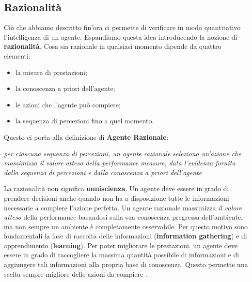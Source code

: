 \subsection{Razionalità}
Ciò che abbiamo descritto fin'ora ci permette di verificare in modo quantitativo l'intelligenza di un agente.
Espandiamo questa idea introducendo la nozione di \textbf{razionalità}.
Cosa sia razionale in qualsiasi momento dipende da quattro elementi:
\begin{itemize}
  \item la misura di prestazioni;
  \item la conoscenza a priori dell'agente;
  \item le azioni che l'agente può compiere;
  \item la sequenza di percezioni fino a quel momento.
\end{itemize}
Questo ci porta alla definizione di \textbf{Agente Razionale}:
      \begin{center}
      \emph{per ciascuna sequenza di percezioni, un agente razionale seleziona un'azione che massimizza il valore atteso della performance measure, data l'evidenza 
      fornita dalla sequenza di percezioni e dalla conoscenza a priori dell'agente}
      \end{center}
La razionalità non significa \textbf{onniscienza}. Un agente deve essere in grado di prendere decisioni anche quando
non ha a disposizione tutte le informazioni necessarie a compiere l'azione perfetta. Un agente razionale massimizza \emph{il valore atteso} della performance
basandosi sulla sua conoscenza pregressa dell'ambiente, ma  non sempre un ambiente è completamente osservabile. Per questo motivo sono
fondamentali la fase di raccolta delle informazioni (\textbf{information gathering}) e di apprendimento (\textbf{learning}). Per poter
migliorare le prestazioni, un  agente deve essere in grado di raccogliere la massima quantità possibile di informazioni
e di aggiungere tali informazioni alla propria base di conoscenza. Questo permette una scelta sempre migliore delle azioni da compiere \cite{aima}.
